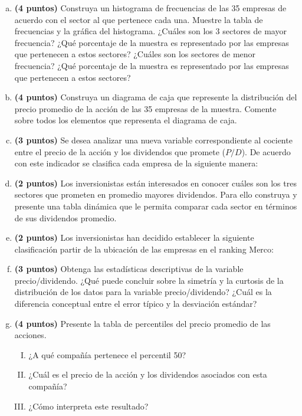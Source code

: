 \documentclass[../main.tex]{subfiles}
\begin{document}
\begin{enumerate}[(a)]

\item \textbf{(4 puntos)} Construya un histograma de frecuencias de las 35 empresas de acuerdo con el sector al que pertenece cada una. Muestre la tabla de frecuencias y la gráfica del histograma. ¿Cuáles son los 3 sectores de mayor frecuencia? ¿Qué porcentaje de la muestra es
representado por las empresas que pertenecen a estos sectores? ¿Cuáles son los sectores de menor frecuencia? ¿Qué porcentaje de la muestra es representado por las empresas que pertenecen a estos sectores?

\item \textbf{(4 puntos)} Construya un diagrama de caja que represente la distribución del precio promedio de la acción de las 35 empresas de la muestra. Comente sobre todos los elementos que representa el diagrama de caja.

\item \textbf{(3 puntos)} Se desea analizar una nueva variable correspondiente al cociente entre el precio de la acción y los dividendos que promete ($P/D$). De acuerdo con este indicador se clasifica cada empresa de la siguiente manera:

\item \textbf{(2 puntos)} Los inversionistas están interesados en conocer cuáles son los tres sectores que prometen en promedio mayores dividendos. Para ello construya y presente una tabla dinámica que le permita comparar cada sector en términos de sus dividendos promedio.

\item \textbf{(2 puntos)} Los inversionistas han decidido establecer la siguiente clasificación partir de la ubicación de las empresas en el ranking Merco:

\item \textbf{(3 puntos)} Obtenga las estadísticas descriptivas de la variable precio/dividendo. ¿Qué puede concluir sobre la simetría y la curtosis de la distribución de los datos para la variable
precio/dividendo? ¿Cuál es la diferencia conceptual entre el error típico y la desviación
estándar?

\item \textbf{(4 puntos)} Presente la tabla de percentiles del precio promedio de las acciones.

\begin{enumerate}[(I)]

\item ¿A qué compañía pertenece el percentil 50?

\item ¿Cuál es el precio de la acción y los dividendos asociados con esta compañía?

\item ¿Cómo interpreta este resultado?

\end{enumerate}

\end{enumerate}
\end{document}
